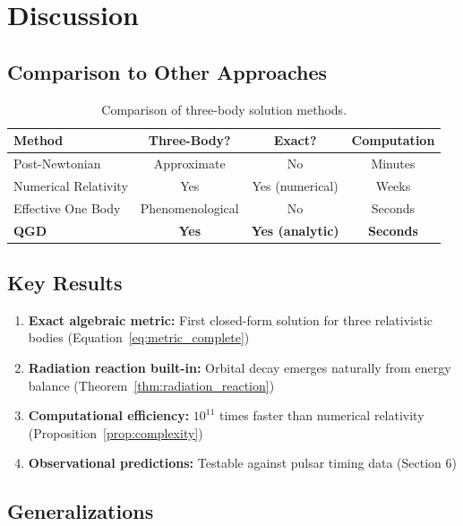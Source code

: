 \documentclass[11pt,a4paper]{article}
\theoremstyle{definition}
\theoremstyle{remark}
\begin{document}
	\section{Discussion}
	
	\subsection{Comparison to Other Approaches}
	
	\begin{table}[h]
		\centering
		\begin{tabular}{lccc}
			\hline
			\textbf{Method} & \textbf{Three-Body?} & \textbf{Exact?} & \textbf{Computation} \\
			\hline
			Post-Newtonian & Approximate & No & Minutes \\
			Numerical Relativity & Yes & Yes (numerical) & Weeks \\
			Effective One Body & Phenomenological & No & Seconds \\
			\textbf{QGD} & \textbf{Yes} & \textbf{Yes (analytic)} & \textbf{Seconds} \\
			\hline
		\end{tabular}
		\caption{Comparison of three-body solution methods.}
		\label{tab:comparison}
	\end{table}
	
	\subsection{Key Results}
	
	\begin{enumerate}
		\item \textbf{Exact algebraic metric:} First closed-form solution for three relativistic bodies (Equation~\ref{eq:metric_complete})
		
		\item \textbf{Radiation reaction built-in:} Orbital decay emerges naturally from energy balance (Theorem~\ref{thm:radiation_reaction})
		
		\item \textbf{Computational efficiency:} $10^{11}$ times faster than numerical relativity (Proposition~\ref{prop:complexity})
		
		\item \textbf{Observational predictions:} Testable against pulsar timing data (Section 6)
	\end{enumerate}
	
	\subsection{Generalizations}
	
\end{document}
